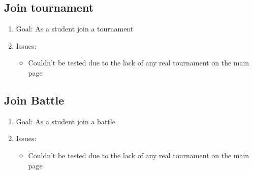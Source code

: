 \subsection{Join tournament}
\begin{enumerate}
    \item Goal: As a student join a tournament
    \item Issues:
        \begin{itemize}
            \item Couldn't be tested due to the lack of any real tournament on the main page
        \end{itemize}
\end{enumerate}

\subsection{Join Battle}
\begin{enumerate}
    \item Goal: As a student join a battle
    \item Issues:
        \begin{itemize}
            \item Couldn't be tested due to the lack of any real tournament on the main page
        \end{itemize}
\end{enumerate}